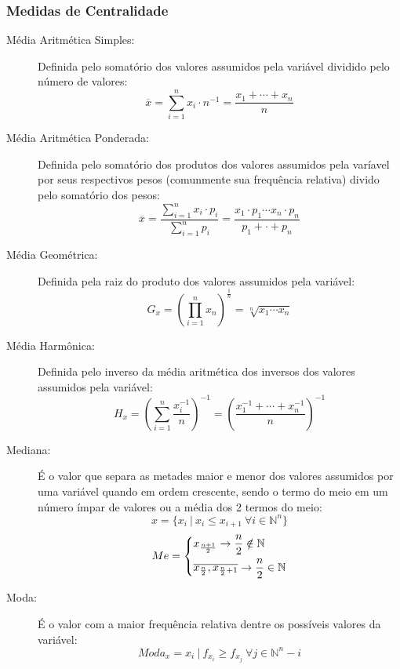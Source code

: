     \subsubsection{Medidas de Centralidade}
        \begin{description}
            \item[Média Aritmética Simples:]
                Definida pelo somatório dos valores assumidos pela variável dividido pelo número de valores:
                \[ \overline{x} = \displaystyle\sum_{i=1}^{n} {x_i \cdot n^{-1}} = \frac{x_1 + \cdots + x_n}{n} \]
            \item[Média Aritmética Ponderada:]
                Definida pelo somatório dos produtos dos valores assumidos pela varíavel por seus respectivos pesos (comunmente sua frequência relativa) divido pelo somatório dos pesos:
                \[ \overline{x} = \frac{\displaystyle\sum_{i=1}^{n} {x_i \cdot p_i}}{\displaystyle\sum_{i=1}^{n} {p_i}} = \frac{x_1 \cdot p_1 \cdots x_n \cdot p_n}{p_1 + \cdot + p_n} \]
            \item[Média Geométrica:]
                Definida pela raiz do produto dos valores assumidos pela variável:
                \[ G_x = \left(\displaystyle\prod_{i=1}^{n} {x_n}\right)^{\frac{1}{n}} = \sqrt[n]{x_1 \cdots x_n} \]
            \item[Média Harmônica:]
                Definida pelo inverso da média aritmética dos inversos dos valores assumidos pela variável:
                \[ H_x = \left(\displaystyle\sum_{i=1}^{n} {\frac{x_{i}^{-1}}{n}}\right)^{-1} = \left(\frac{x_1^{-1} + \cdots + x_n^{-1}}{n}\right)^{-1} \]
            \item[Mediana:]
                É o valor que separa as metades maior e menor dos valores assumidos por uma variável quando em ordem crescente, sendo o termo do meio em um número ímpar de valores ou a média dos 2 termos do meio:
                \[ x = \{ x_i \ | \ x_i \leq x_{i+1} \ \forall i \in \mathbb{N}^n \} \]
                \[ Me = \begin{dcases} x_{\frac{n+1}{2}} \rightarrow \frac{n}{2} \notin \mathbb{N} \\ \overline{x_\frac{n}{2},x_{\frac{n}{2}+1}} \rightarrow \frac{n}{2} \in \mathbb{N} \end{dcases} \]
            \item[Moda:]
                É o valor com a maior frequência relativa dentre os possíveis valores da variável:
                \[ Moda_x = x_i \ | \ f_{x_i} \geq f_{x_j} \ \forall j \in \mathbb{N}^n - i \]
        \end{description}
